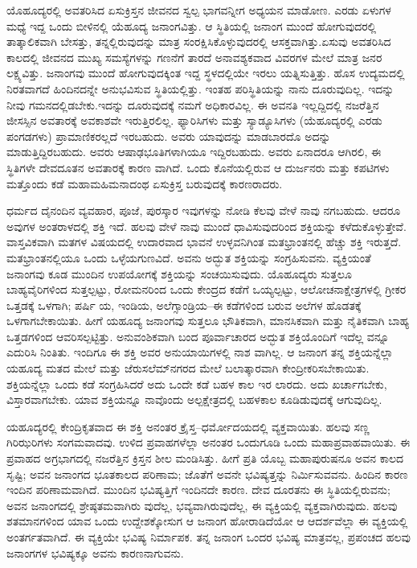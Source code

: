 ಯೊಹೂದ್ಯರಲ್ಲಿ ಅವತರಿಸಿದ ಏಸುಕ್ರಿಸ್ತನ ಜೀವನದ ಸ್ವಲ್ಪ ಭಾಗವನ್ನೀಗ ಅಧ್ಯಯನ ಮಾಡೋಣ. ಎರಡು ಏಳುಗಳ ಮಧ್ಯೆ ಇದ್ದ ಒಂದು ಬೀಳಿನಲ್ಲಿ ಯೆಹೂದ್ಯ ಜನಾಂಗವಿತ್ತು. ಆ ಸ್ಥಿತಿಯಲ್ಲಿ ಜನಾಂಗ ಮುಂದೆ ಹೋಗುವುದರಲ್ಲಿ ತಾತ್ಕಾಲಿಕವಾಗಿ ಬೇಸತ್ತು, ತನ್ನಲ್ಲಿರುವುದನ್ನು ಮಾತ್ರ ಸಂರಕ್ಷಿಸಿಕೊಳ್ಳುವುದರಲ್ಲಿ ಆಸಕ್ತವಾಗಿತ್ತು.ಏಸುವು ಅವತರಿಸಿದ ಕಾಲದಲ್ಲಿ ಜೀವನದ ಮುಖ್ಯ ಸಮಸ್ಯೆಗಳನ್ನು ಗಣನೆಗೆ ತಾರದೆ ಅನಾವಶ್ಯಕವಾದ ವಿವರಗಳ ಮೇಲೆ ಮಾತ್ರ ಜನರ ಲಕ್ಷ್ಯವಿತ್ತು. ಜನಾಂಗವು ಮುಂದೆ ಹೋಗುವುದಕ್ಕಿಂತ ಇದ್ದ ಸ್ಥಳದಲ್ಲಿಯೇ ಇರಲು ಯತ್ನಿಸುತ್ತಿತ್ತು. ಹೊಸ ಉದ್ಯಮದಲ್ಲಿ ನಿರತವಾಗದೆ ಹಿಂದಿನದನ್ನೇ ಅನುಭವಿಸುವ ಸ್ಥಿತಿಯಲ್ಲಿತ್ತು. ಇಂತಹ ಪರಿಸ್ಥಿತಿಯನ್ನು ನಾನು ದೂರುವುದಿಲ್ಲ. ಇದನ್ನು ನೀವು ಗಮನದಲ್ಲಿಡಬೇಕು.ಇದನ್ನು ದೂರುವುದಕ್ಕೆ ನಮಗೆ ಅಧಿಕಾರವಿಲ್ಲ. ಈ ಅವನತಿ ಇಲ್ಲದ್ದಿದಲ್ಲಿ ನಜರೆತ್ತಿನ ಜೀಸಸ್ಸಿನ ಅವತಾರಕ್ಕೆ ಅವಕಾಶವೇ ಇರುತ್ತಿರಲಿಲ್ಲ. ಫ್ಯಾರಿಸಿಗಳು ಮತ್ತು ಸ್ಯಾಡ್ಯೂಸಿಗಳು (ಯೆಹೂದ್ಯರಲ್ಲಿ ಎರಡು ಪಂಗಡಗಳು) ಪ್ರಾಮಾಣಿಕರಲ್ಲದೆ ಇರಬಹುದು. ಅವರು ಯಾವುದನ್ನು ಮಾಡಬಾರದೊ ಅದನ್ನು ಮಾಡುತ್ತಿದ್ದಿರಬಹುದು. ಅವರು ಆಷಾಢಭೂತಿಗಳಾಗಿಯೂ ಇದ್ದಿರಬಹುದು. ಅವರು ಏನಾದರೂ ಆಗಿರಲಿ, ಈ ಸ್ಥಿತಿಗಳೇ ದೇವದೂತನ ಅವತಾರಕ್ಕೆ ಕಾರಣ ವಾಗಿದೆ. ಒಂದು ಕೊನೆಯಲ್ಲಿರುವ ಆ ದುರ್ಜನರು ಮತ್ತು ಕಪಟಿಗಳು ಮತ್ತೊಂದು ಕಡೆ ಮಹಾಮಹಿಮನಾದಂಥ ಏಸುಕ್ರಿಸ್ತ ಬರುವುದಕ್ಕೆ ಕಾರಣರಾದರು.

ಧರ್ಮದ ದೈನಂದಿನ ವ್ಯವಹಾರ, ಪೂಜೆ, ಪುರಸ್ಕಾರ ಇವುಗಳನ್ನು ನೋಡಿ ಕೆಲವು ವೇಳೆ ನಾವು ನಗಬಹುದು. ಆದರೂ ಅವುಗಳ ಅಂತರಾಳದಲ್ಲಿ ಶಕ್ತಿ ಇದೆ. ಹಲವು ವೇಳೆ ನಾವು ಮುಂದೆ ಧಾವಿಸುವುದರಿಂದ ಶಕ್ತಿಯನ್ನು ಕಳೆದುಕೊಳ್ಳುತ್ತೇವೆ. ವಾಸ್ತವಿಕವಾಗಿ ಮತಗಳ ವಿಷಯದಲ್ಲಿ ಉದಾರವಾದ ಭಾವನೆ ಉಳ್ಳವನಿಗಿಂತ ಮತಭ್ರಾಂತನಲ್ಲಿ ಹೆಚ್ಚು ಶಕ್ತಿ ಇರುತ್ತದೆ. ಮತಭ್ರಾಂತನಲ್ಲಿಯೂ ಒಂದು ಒಳ್ಳೆಯಗುಣವಿದೆ. ಅವನು ಅದ್ಭುತ ಶಕ್ತಿಯನ್ನು ಸಂಗ್ರಹಿಸುವನು. ವ್ಯಕ್ತಿಯಂತೆ ಜನಾಂಗವು ಕೂಡ ಮುಂದಿನ ಉಪಯೋಗಕ್ಕೆ ಶಕ್ತಿಯನ್ನು ಸಂಚಯಿಸುವುದು. ಯೊಹೂದ್ಯರು ಸುತ್ತಲೂ ಬಾಹ್ಯವೈರಿಗಳಿಂದ ಸುತ್ತಲ್ಪಟ್ಟು, ರೋಮನರಿಂದ ಒಂದು ಕೇಂದ್ರದ ಕಡೆಗೆ ಒಯ್ಯಲ್ಪಟ್ಟು, ಆಲೋಚನಾಕ್ಷೇತ್ರಗಳಲ್ಲಿ ಗ್ರೀಕರ ಒತ್ತಡಕ್ಕೆ ಒಳಗಾಗಿ; ಪರ್ಷಿ ಯ, ಇಂಡಿಯ, ಅಲೆಗ್ಸಾಂಡ್ರಿಯ–ಈ ಕಡೆಗಳಿಂದ ಬರುವ ಅಲೆಗಳ ಹೊಡತಕ್ಕೆ ಒಳಗಾಗಬೇಕಾಯಿತು. ಹೀಗೆ ಯಹೂದ್ಯ ಜನಾಂಗವು ಸುತ್ತಲೂ ಭೌತಿಕವಾಗಿ, ಮಾನಸಿಕವಾಗಿ ಮತ್ತು ನೈತಿಕವಾಗಿ ಬಾಹ್ಯ ಒತ್ತಡಗಳಿಂದ ಆವರಿಸಲ್ಪಟ್ಟಿತ್ತು. ಅನುವಂಶಿಕವಾಗಿ ಬಂದ ಪೂರ್ವಾಚಾರದ ಅದ್ಭುತ ಶಕ್ತಿಯೊಂದಿಗೆ ಇದೆಲ್ಲ ವನ್ನೂ ಎದುರಿಸಿ ನಿಂತಿತು. ಇಂದಿಗೂ ಈ ಶಕ್ತಿ ಅವರ ಅನುಯಾಯಿಗಳಲ್ಲಿ ನಾಶ ವಾಗಿಲ್ಲ. ಆ ಜನಾಂಗ ತನ್ನ ಶಕ್ತಿಯನ್ನೆಲ್ಲಾ ಯಹೂದ್ಯ ಮತದ ಮೇಲೆ ಮತ್ತು ಜೆರುಸಲೆಮ್​ನಗರದ ಮೇಲೆ ಬಲಾತ್ಕಾರವಾಗಿ ಕೇಂದ್ರೀಕರಿಸಬೇಕಾಯಿತು. ಶಕ್ತಿಯನ್ನೆಲ್ಲಾ ಒಂದು ಕಡೆ ಸಂಗ್ರಹಿಸಿದರೆ ಅದು ಒಂದೇ ಕಡೆ ಬಹಳ ಕಾಲ ಇರ ಲಾರದು. ಅದು ಖರ್ಚಾಗಬೇಕು, ವಿಸ್ತಾರವಾಗಬೇಕು. ಯಾವ ಶಕ್ತಿಯನ್ನೂ ನಾವೊಂದು ಅಲ್ಪಕ್ಷೇತ್ರದಲ್ಲಿ ಬಹಳಕಾಲ ಕೂಡಿಡುವುದಕ್ಕೆ ಆಗುವುದಿಲ್ಲ.

ಯಹೂದ್ಯರಲ್ಲಿ ಕೇಂದ್ರಿಕೃತವಾದ ಈ ಶಕ್ತಿ ಅನಂತರ ಕ್ರೈಸ್ತ–ಧರ್ಮೋದಯದಲ್ಲಿ ವ್ಯಕ್ತವಾಯಿತು. ಹಲವು ಸಣ್ಣ ಗಿರಿಝರಿಗಳು ಸಂಗಮವಾದವು. ಉಳಿದ ಪ್ರವಾಹಗಳೆಲ್ಲಾ ಅನಂತರ ಒಂದುಗೂಡಿ ಒಂದು ಮಹಾಪ್ರವಾಹವಾಯಿತು. ಈ ಪ್ರವಾಹದ ಅಗ್ರಭಾಗದಲ್ಲಿ ನಜರೆತ್ತಿನ ಕ್ರಿಸ್ತನ ಶೀಲ ಮಂಡಿಸಿತ್ತು. ಹೀಗೆ ಪ್ರತಿ ಯೊಬ್ಬ ಮಹಾಪುರುಷನೂ ಅವನ ಕಾಲದ ಸೃಷ್ಟಿ; ಅವನ ಜನಾಂಗದ ಭೂತಕಾಲದ ಪರಿಣಾಮ; ಜೊತೆಗೆ ಅವನೇ ಭವಿಷ್ಯತ್ತನ್ನು ನಿರ್ಮಿಸುವವನು. ಹಿಂದಿನ ಕಾರಣ ಇಂದಿನ ಪರಿಣಾಮವಾಗಿದೆ. ಮುಂದಿನ ಭವಿಷ್ಯತ್ತಿಗೆ ಇಂದಿನದೇ ಕಾರಣ. ದೇವ ದೂರತನು ಈ ಸ್ಥಿತಿಯಲ್ಲಿರುವನು; ಅವನ ಜನಾಂಗದಲ್ಲಿ ಶ್ರೇಷ್ಠತಮವಾಗಿರು ವುದೆಲ್ಲ, ಭವ್ಯವಾಗಿರುವುದೆಲ್ಲ, ಈ ವ್ಯಕ್ತಿಯಲ್ಲಿ ವ್ಯಕ್ತವಾಗಿರುವುದು. ಹಲವು ಶತಮಾನಗಳಿಂದ ಯಾವ ಒಂದು ಉದ್ದೇಶಕ್ಕೋಸುಗ ಆ ಜನಾಂಗ ಹೋರಾಡಿದೆಯೋ ಆ ಆದರ್ಶವೆಲ್ಲಾ ಈ ವ್ಯಕ್ತಿಯಲ್ಲಿ ಅಂತರ್ಗತವಾಗಿದೆ. ಈ ವ್ಯಕ್ತಿಯೇ ಭವಿಷ್ಯ ನಿರ್ಮಾಪಕ. ತನ್ನ ಜನಾಂಗ ಒಂದರ ಭವಿಷ್ಯ ಮಾತ್ರವಲ್ಲ, ಪ್ರಪಂಚದ ಹಲವು ಜನಾಂಗಗಳ ಭವಿಷ್ಯಕ್ಕೂ ಅವನು ಕಾರಣನಾಗುವನು.

